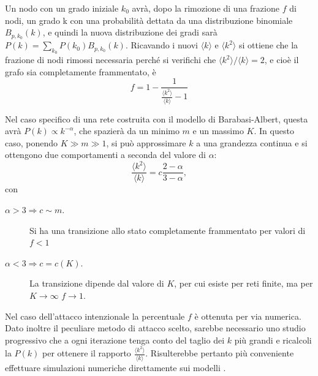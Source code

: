 Un nodo con un grado iniziale $k_0$ avr\`a, dopo la rimozione di una frazione $f$ di nodi, un grado k con una probabilit\`a dettata da una distribuzione binomiale $B_{p,k_0}(k)$, e quindi la nuova distribuzione dei gradi sar\`a $P(k) = \sum_{k_0} P(k_0)B_{p,k_0}(k)$. Ricavando i nuovi $\langle k \rangle$ e $\langle k^2 \rangle$ si ottiene che la frazione di nodi rimossi necessaria perch\'e si verifichi che $\langle k^2\rangle/\langle k \rangle = 2$, e cio\`e il grafo sia completamente frammentato, \`e 
\begin{equation}
 \label{eq:criterionfreq}
 f = 1 - \frac{1}{\frac{\langle k^2 \rangle}{\langle k \rangle}-1}
\end{equation}

Nel caso specifico di una rete costruita con il modello di Barabasi-Albert, questa avr\`a $P(k)\propto k^{-\alpha}$, che spazier\`a da un minimo $m$ e un massimo $K$. In questo caso, ponendo $K\gg m \gg 1$, si pu\`o approssimare $k$ a una grandezza continua e si ottengono due comportamenti a seconda del valore di $\alpha$:
 \[\frac{\langle k^2\rangle}{\langle k \rangle} = c \frac{2-\alpha}{3-\alpha},\]
 con
\begin{description}
 \item[$\alpha > 3 \Rightarrow c\sim m.$] Si ha una transizione allo stato completamente frammentato per valori di $f<1$
 \item[$\alpha < 3 \Rightarrow c=c(K).$] La transizione dipende dal valore di $K$, per cui esiste per reti finite, ma per $K \rightarrow \infty$ $f\rightarrow1$.
\end{description}

Nel caso dell'attacco intenzionale la percentuale $f$ \`e ottenuta per via numerica. Dato inoltre il peculiare metodo di attacco scelto, sarebbe necessario uno studio progressivo che a ogni iterazione tenga conto del taglio dei $k$ pi\`u grandi e ricalcoli la $P(k)$ per ottenere il rapporto $\frac{\langle k^2 \rangle}{\langle k \rangle}$. Risulterebbe pertanto pi\`u conveniente effettuare simulazioni numeriche direttamente sui modelli \parencite{Cohen2001}.


